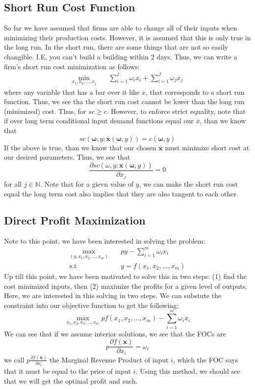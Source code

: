 \documentclass[12pt]{article}
\newcommand{\st}{\text{s.t}}
\newcommand{\N}{\mathbb{N}}
\begin{document}
\subsection{Short Run Cost Function}
So far we have assumed that firms are able to change all of their inputs when minimizing their production costs. However, it is assumed that this is only true in the long run. In the short run, there are some things that are not so easily changible. I.E, you can't build a building within 2 days. Thus, we can write a firm's short run cost minimization as follows:
\begin{align*}
    \min_{x_1, x_2, \dots, x_j} & \quad \sum_{i = 1}^{I} \omega_i x_i + \sum_{i = 1}^{J} \overline{\omega}_j \overline{x}_j 
\end{align*}
where any variable that has a bar over it like $\overline{x}$, that corresponds to a short run function. Thus, we see tha the short run cost cannot be lower than the long run (minimized) cost. Thus, for $sc \geq c$. However, to enforce strict equality, note that if over long term conditional input demand functions equal our $\overline{x}$, than we know that 
\[
sc(\mathbf{\omega}, y ; \mathbf{\overline{x}}(\mathbf{\omega}, y)) = c(\mathbf{\omega}, y)
\]
If the above is true, than we know that our chosen $\mathbf{\overline{x}}$ must minimize short cost at our desired parameters. Thus, we see that 
\[
\frac{\partial sc(\omega, y ; \mathbf{\overline{x}}(\mathbf{\omega}, y))}{\partial \overline{x}_j} = 0
\]
for all $j \in \N$. Note that for a gievn value of $y$, we can make the short run cost equal the long term cost also implies that they are also tangent to each other. 
\subsection{Direct Profit Maximization}
Note to this point, we have been interested in solving the problem:
\begin{align*}
    \max_{(y, x_1, x_2, \dots, x_m)} & \quad py - \sum_{i=1}^{m} \omega_i x_i\\
    \st & \quad y = f(x_1, x_2, \dots, x_m)
\end{align*}
Up till this point, we have been motivated to solve this in two steps: (1) find the cost minimized inputs, then (2) maximize the profits for a given level of outputs. Here, we are interested in this solving in two steps. We can substute the constraint into our objective function to get the following:
\[
\max_{x_1, x_2, x_3, \dots, x_m} pf(x_1, x_2, \dots, x_m) - \sum_{i = 1}^m \omega_i x_i
\]
We can see that if we assume interior solutions, we see that the FOCs are 
\[
p \frac{\partial f(\mathbf{x})}{\partial x_i} = \omega_i 
\]
we call $p \frac{\partial f(\mathbf{x})}{\partial x_i}$ the Marginal Revenue Product of input $i$, which the FOC says that it must be equal to the price of input $i$. Using this method, we should see that we will get the optimal profit and such. 
\end{document}
